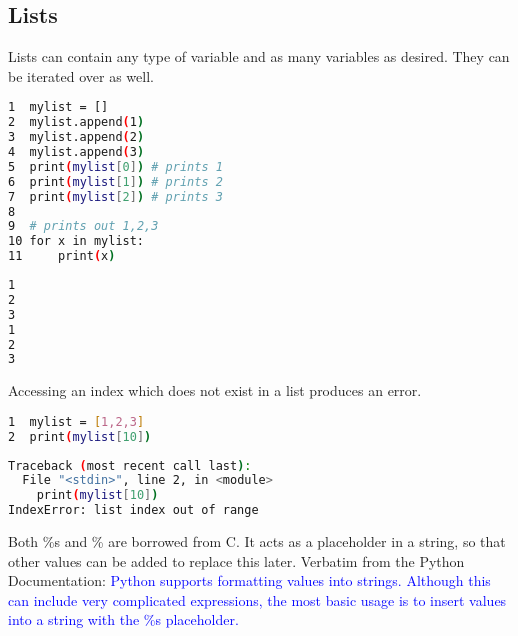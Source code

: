 \documentclass[crop=false,class=book]{standalone}
\begin{document}
\subsection{Lists}
Lists can contain any type of variable and as many variables as desired. They can be iterated over as well.\newline
\begin{minipage}[t]{.48\textwidth}
\centering
\begin{lstlisting}[language=bash,basicstyle=\small\ttfamily,frame=single,caption=input]
1  mylist = []
2  mylist.append(1)
3  mylist.append(2)
4  mylist.append(3)
5  print(mylist[0]) # prints 1
6  print(mylist[1]) # prints 2
7  print(mylist[2]) # prints 3
8
9  # prints out 1,2,3
10 for x in mylist:
11     print(x)
\end{lstlisting}
\end{minipage}\hfill
\begin{minipage}[t]{.48\textwidth}
\centering
\begin{lstlisting}[language=bash,basicstyle=\small\ttfamily,frame=single,caption=output]
1
2
3
1
2
3
\end{lstlisting}
\end{minipage}\newline
Accessing an index which does not exist in a list produces an error.\newline
\begin{minipage}[t]{.48\textwidth}
\centering
\begin{lstlisting}[language=bash,basicstyle=\small\ttfamily,frame=single,caption=input]
1  mylist = [1,2,3]
2  print(mylist[10])
\end{lstlisting}
\end{minipage}\hfill
\begin{minipage}[t]{.48\textwidth}
\centering
\begin{lstlisting}[language=bash,basicstyle=\small\ttfamily,frame=single,caption=output]
Traceback (most recent call last):
  File "<stdin>", line 2, in <module>
    print(mylist[10])
IndexError: list index out of range
\end{lstlisting}
\end{minipage}\newline
Both \%s and \% are borrowed from C. It acts as a placeholder in a string, so that other values can be added to replace this later. Verbatim from the Python Documentation:\newline
\textcolor{blue}{Python supports formatting values into strings. Although this can include very complicated expressions, the most basic usage is to insert values into a string with the \%s placeholder.}\newline
\end{document}

